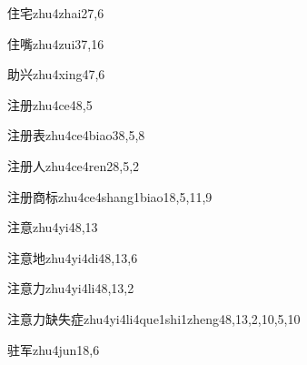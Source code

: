 \begin{entry}{住宅}{zhu4zhai2}{7,6}
\end{entry}

\begin{entry}{住嘴}{zhu4zui3}{7,16}
\end{entry}

\begin{entry}{助兴}{zhu4xing4}{7,6}
\end{entry}

\begin{entry}{注册}{zhu4ce4}{8,5}
\end{entry}

\begin{entry}{注册表}{zhu4ce4biao3}{8,5,8}
\end{entry}

\begin{entry}{注册人}{zhu4ce4ren2}{8,5,2}
\end{entry}

\begin{entry}{注册商标}{zhu4ce4shang1biao1}{8,5,11,9}
\end{entry}

\begin{entry}{注意}{zhu4yi4}{8,13}
\end{entry}

\begin{entry}{注意地}{zhu4yi4di4}{8,13,6}
\end{entry}

\begin{entry}{注意力}{zhu4yi4li4}{8,13,2}
\end{entry}

\begin{entry}{注意力缺失症}{zhu4yi4li4que1shi1zheng4}{8,13,2,10,5,10}
\end{entry}

\begin{entry}{驻军}{zhu4jun1}{8,6}
\end{entry}

